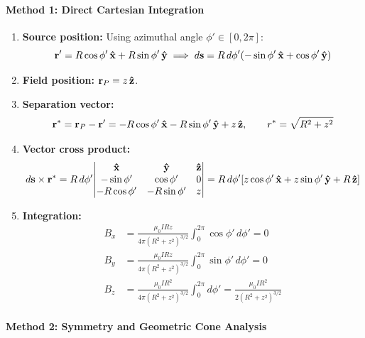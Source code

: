 \paragraph{Method 1: Direct Cartesian Integration}
\begin{enumerate}
    \item \textbf{Source position:} Using azimuthal angle $\phi' \in [0, 2\pi]$:
    \begin{equation}
        \vb{r}' = R\cos\phi'\,\vu{x} + R\sin\phi'\,\vu{y} \implies d\vb{s} = R\,d\phi'\qty(-\sin\phi'\,\vu{x} + \cos\phi'\,\vu{y})
    \end{equation}
    \item \textbf{Field position:} $\vb{r}_P = z\,\vu{z}$.
    \item \textbf{Separation vector:}
    \begin{equation}
        \vb{r}^* = \vb{r}_P - \vb{r}' = -R\cos\phi'\,\vu{x} - R\sin\phi'\,\vu{y} + z\,\vu{z}, \qquad r^* = \sqrt{R^2 + z^2}
    \end{equation}
    \item \textbf{Vector cross product:}
    \begin{equation}
        d\vb{s} \times \vb{r}^* = R\,d\phi'\mqty| \vu{x} & \vu{y} & \vu{z} \\ -\sin\phi' & \cos\phi' & 0 \\ -R\cos\phi' & -R\sin\phi' & z | = R\,d\phi'\qty[z\cos\phi'\,\vu{x} + z\sin\phi'\,\vu{y} + R\,\vu{z}]
    \end{equation}
    \item \textbf{Integration:}
    \begin{align}
        B_x &= \frac{\mu_0 I R z}{4\pi (R^2+z^2)^{3/2}} \int_0^{2\pi} \cos\phi'\,d\phi' = 0 \\
        B_y &= \frac{\mu_0 I R z}{4\pi (R^2+z^2)^{3/2}} \int_0^{2\pi} \sin\phi'\,d\phi' = 0 \\
        B_z &= \frac{\mu_0 I R^2}{4\pi (R^2+z^2)^{3/2}} \int_0^{2\pi} d\phi' = \frac{\mu_0 I R^2}{2(R^2+z^2)^{3/2}}
    \end{align}
\end{enumerate}

\paragraph{Method 2: Symmetry and Geometric Cone Analysis}

